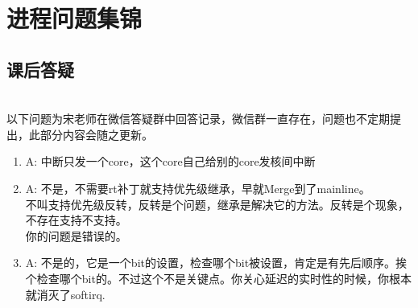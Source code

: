 

\partabstractfp{}
\partabstractrp{}

\part{进程问题集锦}

\chapter{课后答疑}


~\\以下问题为宋老师在微信答疑群中回答记录，微信群一直存在，问题也不定期提出，此部分内容会随之更新。
\begin{enumerate}
  \item
\begin{tcolorbox}[colback=green!5,colframe=green!75!black]
\tcblower
A: 中断只发一个core，这个core自己给别的core发核间中断
\end{tcolorbox}

  \item
\begin{tcolorbox}[colback=green!5,colframe=green!75!black]
\tcblower
A: 不是，不需要rt补丁就支持优先级继承，早就Merge到了mainline。\\
不叫支持优先级反转，反转是个问题，继承是解决它的方法。反转是个现象，不存在支持不支持。\\
你的问题是错误的。
\end{tcolorbox}


  \item
\begin{tcolorbox}[colback=green!5,colframe=green!75!black]
\tcblower
A: 不是的，它是一个bit的设置，检查哪个bit被设置，肯定是有先后顺序。挨个检查哪个bit的。不过这个不是关键点。你关心延迟的实时性的时候，你根本就消灭了softirq.
\end{tcolorbox}


\end{enumerate}

